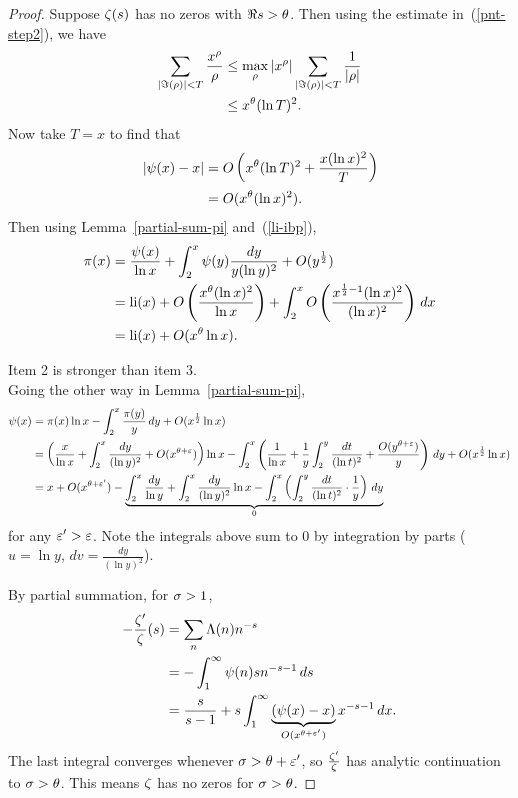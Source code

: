 \begin{proof}
 Suppose $\zeta(s)$ has no zeros with $\Re s>\theta$. Then using the estimate in~(\ref{pnt-step2}), we have
\begin{align*}
\sum_{|\Im(\rho)|<T} \frac{x^{\rho}}{\rho}
&\le \max_{\rho}|x^{\rho}|\sum_{|\Im(\rho)|<T}\frac{1}{|\rho|}\\
&\le x^{\theta}(\ln T)^2.
\end{align*}
Now take $T=x$ to find that
\begin{align*}
|\psi(x)-x|&=O\pa{x^{\te}(\ln T)^2+\frac{x(\ln x)^2}{T}%
}\\
&=O(x^{\te}(\ln x)^2).
\end{align*}
Then using Lemma~\ref{partial-sum-pi} and~(\ref{li-ibp}),
\begin{align*}
\pi(x)&=\frac{\psi(x)}{\ln x} +\int_2^x \psi(y)\frac{dy}{y(\ln y)^2}+O(y^{\frac{1}{2}})\\
&=\operatorname{li}(x)+O\left( {\frac{x^{\theta}(\ln x)^2}{\ln x}} \right)+\int_2^x O
\left( {\frac{x^{\frac{1}{2}-1}(\ln x)^2}{(\ln x)^2}} \right)\,dx
\\
&=\operatorname{li}(x)+O(x^{\theta}\ln x).
\end{align*}

 Item 2 is stronger than item 3.\\

Going the other way in Lemma~\ref{partial-sum-pi},
\begin{align*}
\psi(x)&=\pi(x)\ln x-\int_2^x \frac{\pi(y)}{y}\,dy +O(x^{\frac{1}{2}}\ln x)\\
&=\left( {\frac{x}{\ln x} +\int_2^x \frac{dy}{(\ln y)^2}+O(x^{\theta+\varepsilon})} \right)\ln x
-\int_2^x\left( {\frac{1}{\ln x} +\frac{1}{y} \int_2^y \frac{dt}{(\ln t)^2}+\frac{O(y^{\theta+\varepsilon})}{y}} \right)\,dy+O(x^{\frac{1}{2}}\ln x)\\
&=x+O(x^{\theta+\varepsilon'})-\underbrace{\int_2^x \frac{dy}{\ln y}+\int_2^x\frac{dy}{(\ln y)^2}\ln x -\int_2^x\left( {\int_2^y \frac{dt}{(\ln t)^2} \cdot \frac{1}{y}} \right)\,dy}_0
\end{align*}
for any $\varepsilon'>\varepsilon$. Note the integrals above sum to 0 by integration by parts ($u=\ln y$, $dv=\frac{dy}{(\ln y)^2}$).

By partial summation, for $\sigma>1$,
\begin{align*}
-\frac{\zeta'}{\zeta}(s)&=\sum_{n}\Lambda(n) n^{-s}\\
&=-\int_1^{\infty} \psi(n)sn^{-s-1}\,ds\\
&=\frac{s}{s-1}+s\int_1^{\infty} \underbrace{(\psi(x)-x)}_{O(x^{\theta+\varepsilon'})}x^{-s-1}\,dx.
\end{align*}
The last integral converges whenever $\sigma>\theta+\varepsilon'$, so $\frac{\zeta'}{\zeta}$ has analytic continuation to $\sigma>\theta$. This means $\zeta$ has no zeros for $\sigma>\theta$.
\end{proof}
